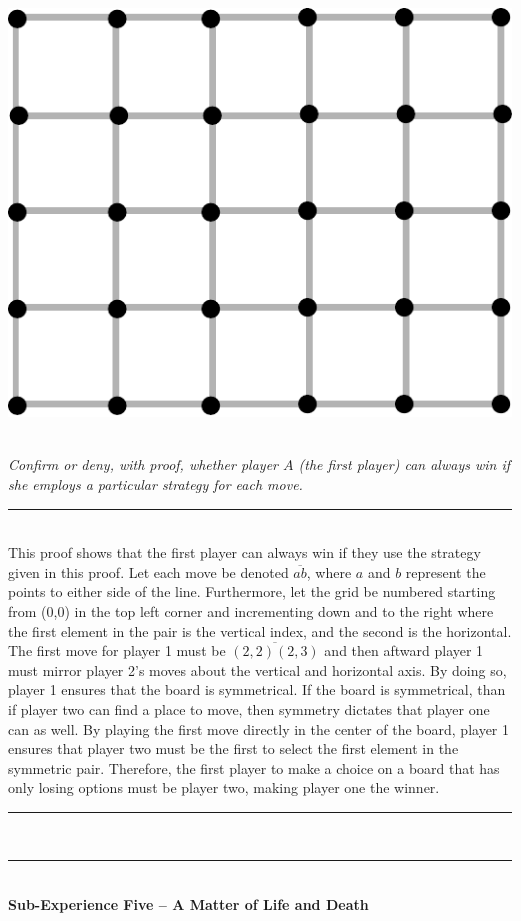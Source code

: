 \documentclass{article}
\newcommand{\problemsep}{\leavevmode\\[0.05in] \rule[\baselineskip/4]{\textwidth}{1pt} \\[0.005in] \rule[\baselineskip]{\textwidth}{1pt}\vspace{-\baselineskip/2}\leavevmode\\[0.05in]}
\newcommand{\statementsep}{\leavevmode\\[0.005in] \rule[\baselineskip/4]{\textwidth}{0.4pt}\leavevmode\\[0.005in]}
\begin{document}
\begin{center}
\includegraphics[scale=0.5]{Figures/Saturator_Grid}
\end{center}
\\
\noindent \emph{Confirm or deny, with proof, whether player $A$ (the first player) 
can always win if she employs a particular strategy for each move.}
\statementsep
This proof shows that the first player can always win if they use the strategy given in this proof. Let each move be denoted $\overline{ab}$, where $a$ and $b$ represent the points to either side of the line. Furthermore, let the grid be numbered starting from (0,0) in the top left corner and incrementing down and to the right where the first element in the pair is the vertical index, and the second is the horizontal. The first move for player 1 must be $\overline{(2,2)(2,3)}$ and then aftward player 1 must mirror player 2's moves about the vertical and horizontal axis. By doing so, player 1 ensures that the board is symmetrical.  If the board is symmetrical, than if player two can find a place to move, then symmetry dictates that player one can as well. By playing the first move directly in the center of the board, player 1 ensures that player two must be the first to select the first element in the symmetric pair. Therefore, the first player to make a choice on a board that has only losing options must be player two, making player one the winner.
\problemsep
\noindent \maltese \hspace{1em} {\bf Sub-Experience Five -- A Matter of Life and 
Death}\\
\end{document}
